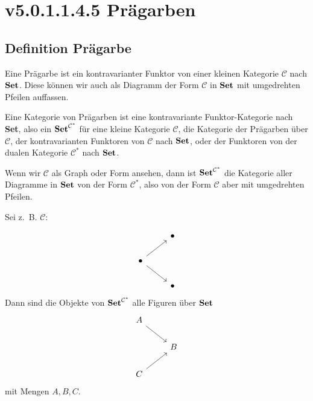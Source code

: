 \documentclass[a4paper]{amsart}
\theoremstyle{definition}
\newcommand{\CC}{\ensuremath{\mathcal{ C }}}
\newcommand{\Set}{\text{\textbf{Set}}}
\newcommand{\zb}{z.~B. }
\begin{document}
\section{v5.0.1.1.4.5 Prägarben}

\subsection{Definition Prägarbe}
Eine Prägarbe ist ein kontravarianter Funktor von einer kleinen Kategorie $\CC$ nach $\Set$. Diese können wir auch als Diagramm der Form $\CC$ in $\Set$ mit umgedrehten Pfeilen auffassen.


Eine Kategorie von Prägarben ist eine kontravariante Funktor-Kategorie nach \textbf{Set}, also ein $\Set^{\CC^*}$ für eine kleine Kategorie $\CC$, die Kategorie der Prägarben über $\CC$, der kontravarianten Funktoren von $\CC$ nach $\Set$, oder der Funktoren von der dualen Kategorie $\CC^*$ nach $\Set$.

Wenn wir $\CC$ als Graph oder Form ansehen, dann ist $\Set^{\CC^*}$ die Kategorie aller Diagramme in $\Set$ von der Form $\CC^*$, also von der Form $\CC$ aber mit umgedrehten Pfeilen.

Sei \zb $\CC$:

\begin{equation}
   \begin{tikzcd}
      & \bullet\\
      \bullet \arrow[ur]  \arrow[dr] \\
      & \bullet
   \end{tikzcd}
\end{equation}
Dann sind die Objekte von $\Set^{\CC^*}$ alle Figuren über $\Set$
\begin{equation}
   \begin{tikzcd}
      A \arrow[dr]\\
      &B    \\
      C \arrow[ur]
   \end{tikzcd}
\end{equation}
mit Mengen $A,B,C$.
\end{document}

